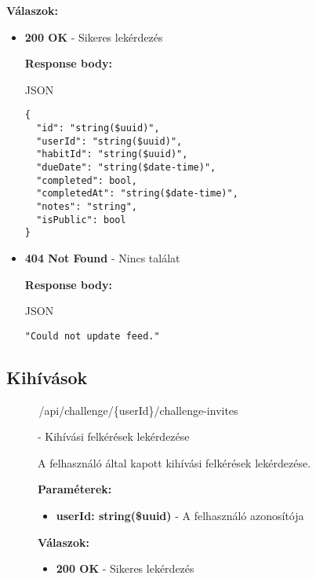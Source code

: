 \documentclass[12pt]{report}
\newcommand{\httpGet}[1]{\colorbox{getColor}{\textbf{\textcolor{white}{GET}}}~#1}
\begin{document}
\begin{itemize}
\begin{description}
    \vspace{0.5cm}
    \textbf{Válaszok:}
    \begin{itemize}
      \item \textbf{200 OK} - Sikeres lekérdezés

        \textbf{Response body:}
        \begin{codeblock}{JSON}
          \begin{verbatim}
{
  "id": "string($uuid)",
  "userId": "string($uuid)",
  "habitId": "string($uuid)",
  "dueDate": "string($date-time)",
  "completed": bool,
  "completedAt": "string($date-time)",
  "notes": "string",
  "isPublic": bool
}
          \end{verbatim}
        \end{codeblock}

      \item \textbf{404 Not Found} - Nincs találat
      
        \textbf{Response body:}
        \begin{codeblock}{JSON}
          \begin{verbatim}
"Could not update feed."
          \end{verbatim}
        \end{codeblock}
    \end{itemize}
\end{description}

\subsection{Kihívások}
\begin{description}
  \item[\httpGet{/api/challenge/\{userId\}/challenge-invites}] - Kihívási felkérések lekérdezése
  
    \vspace{0.5cm}
    A felhasználó által kapott kihívási felkérések lekérdezése.

    \vspace{0.5cm}
    \textbf{Paraméterek:}
    \begin{itemize}
      \item \textbf{userId: string(\$uuid)} - A felhasználó azonosítója
    \end{itemize}

    \vspace{0.5cm}
    \textbf{Válaszok:}
    \begin{itemize}
      \item \textbf{200 OK} - Sikeres lekérdezés


\end{itemize}
\end{description}
\end{itemize}
\end{document}
